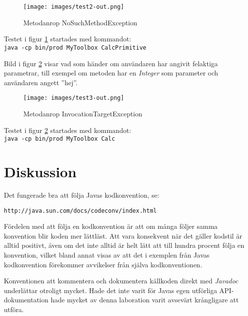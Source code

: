 \documentclass[a4paper, 12pt]{article}
\begin{document}
\begin{figure}[H]
  \begin{center}
    \texttt{[image: images/test2-out.png]}
    \caption{Metodanrop NoSuchMethodException}
    \label{fig:test2-out}
  \end{center}
\end{figure}

Testet i figur \ref{fig:test2-out} startades med kommandot:\\
\verb!java -cp bin/prod MyToolbox CalcPrimitive!

\newpage
Bild i figur \ref{fig:test3-out} visar vad som händer om användaren har
angivit felaktiga parametrar, till exempel om metoden har en
\textit{Integer} som parameter och användaren angett ''hej''.

\begin{figure}[H]
  \begin{center}
    \texttt{[image: images/test3-out.png]}
    \caption{Metodanrop InvocationTargetException}
    \label{fig:test3-out}
  \end{center}
\end{figure}

Testet i figur \ref{fig:test3-out} startades med kommandot:\\
\verb!java -cp bin/prod MyToolbox Calc!

\section{Diskussion}

Det fungerade bra att följa Javas kodkonvention, se:

\verb!http://java.sun.com/docs/codeconv/index.html!

Fördelen med att följa en kodkonvention är att om många följer samma
konvention blir koden mer lättläst. Att vara konsekvent när det gäller
kodstil är alltid positivt, även om det inte alltid är helt lätt att
till hundra procent följa en konvention, vilket bland annat visas av
att det i exemplen från Javas kodkonvention förekommer avvikelser från
själva kodkonventionen.

Konventionen att kommentera och dokumentera källkoden direkt med
\textit{Javadoc} underlättar otroligt mycket. Hade det inte varit för
Javas egen utförliga API-dokumentation hade mycket av denna laboration
varit  avsevärt krång\-ligare att utföra.
\end{document}

